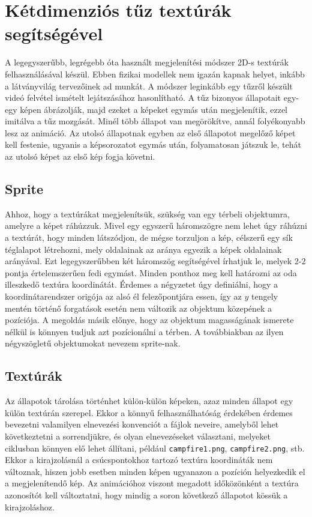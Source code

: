 

\section{Kétdimenziós tűz textúrák segítségével}

A legegyszerűbb, legrégebb óta használt megjelenítési módszer 2D-s textúrák felhasználásával készül. Ebben fizikai modellek nem igazán kapnak helyet, inkább a látványvilág tervezőinek ad munkát. A módszer leginkább egy tűzről készült videó felvétel ismételt lejátszásához hasonlítható. A tűz bizonyos állapotait egy-egy képen ábrázolják, majd ezeket a képeket egymás után megjelenítik, ezzel imitálva a tűz mozgását. Minél több állapot van megörökítve, annál folyékonyabb lesz az animáció. Az utolsó állapotnak egyben az első állapotot megelőző képet kell festenie, ugyanis a képsorozatot egymás után, folyamatosan játszuk le, tehát az utolsó képet az első kép fogja követni.

\subsection{Sprite}
Ahhoz, hogy a textúrákat megjelenítsük, szükség van egy térbeli objektumra, amelyre a képet ráhúzzuk. Mivel egy egyszerű háromszögre nem lehet úgy ráhúzni a textúrát, hogy minden látszódjon, de mégse torzuljon a kép, célszerű egy sík téglalapot létrehozni, mely oldalainak az aránya egyezik a képek oldalainak arányával. Ezt legegyszerűbben két háromszög segítségével írhatjuk le, melyek 2-2 pontja értelemszerűen fedi egymást. Minden ponthoz meg kell határozni az oda illeszkedő textúra koordinátát. Érdemes a négyzetet úgy definiálni, hogy a koordinátarendszer origója az alsó él felezőpontjára essen, így az $y$ tengely mentén történő forgatások esetén nem változik az objektum közepének a pozíciója. A megoldás másik előnye, hogy az objektum magasságának ismerete nélkül is könnyen tudjuk azt pozícionálni a térben. A továbbiakban az ilyen négyszögletű objektumokat nevezem sprite-nak.

\subsection{Textúrák}
Az állapotok tárolása történhet külön-külön képeken, azaz minden állapot egy külön textúrán szerepel. Ekkor a könnyű felhasználhatóság érdekében érdemes bevezetni valamilyen elnevezési konvenciót a fájlok neveire, amelyből lehet következtetni a sorrendjükre, és olyan elnevezéseket választani, melyeket ciklusban könnyen elő lehet állítani, például \texttt{campfire1.png}, \texttt{campfire2.png}, stb. Ekkor a kirajzolásnál a csúcspontokhoz tartozó textúra koordináták nem változnak, hiszen jobb esetben minden képen ugyanazon a pozíción helyezkedik el a megjelenítendő kép. Az animációhoz viszont megadott időközönként a textúra azonosítót kell változtatni, hogy mindig a soron következő állapotot kössük a kirajzoláshoz.

